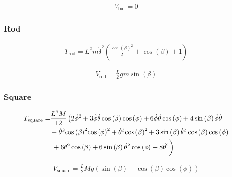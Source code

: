  \begin{equation}
    \begin{split}
        V_\text{bar} = 0
    \end{split}
 \end{equation}

 \subsubsection{Rod}

 \begin{equation}
    \begin{split}
        T_\text{rod} = L^2m\mathrm{\dot\theta}^2\left(\frac{\cos\left(\beta \right)^2}{2}+\cos\left(\beta \right)+1\right)
    \end{split}
 \end{equation}

 \begin{equation}
    \begin{split}
        V_\text{rod} = \frac{L}{2}gm\sin\left(\beta \right)
    \end{split}
 \end{equation}

 \subsubsection{Square}

 \begin{equation}
    \begin{split}
        T_\text{square} = &\frac{L^2M}{12}\left(2{\mathrm{\dot\phi}}^2+3\mathrm{\dot\phi}\mathrm{\dot\theta}\cos\left(\beta \right)\cos\left(\phi \right)+6\mathrm{\dot\phi}\mathrm{\dot\theta}\cos\left(\phi \right)+4\sin\left(\beta \right)\mathrm{\dot\phi}\mathrm{\dot\theta}\right.\\
        &-{\mathrm{\dot\theta}}^2{\cos\left(\beta \right)}^2{\cos\left(\phi \right)}^2+{\mathrm{\dot\theta}}^2{\cos\left(\beta \right)}^2+3\sin\left(\beta \right){\mathrm{\dot\theta}}^2\cos\left(\beta \right)\cos\left(\phi \right)\\
        &\left.\vphantom{\int}+6{\mathrm{\dot\theta}}^2\cos\left(\beta \right)+6\sin\left(\beta \right){\mathrm{\dot\theta}}^2\cos\left(\phi \right)+8{\mathrm{\dot\theta}}^2\right)
    \end{split}
 \end{equation}

 \begin{equation}
    \begin{split}
        V_\text{square} = \frac{L}{2}Mg\left(\sin\left(\beta \right)-\cos\left(\beta \right)\cos\left(\phi \right)\right)
    \end{split}
 \end{equation}

